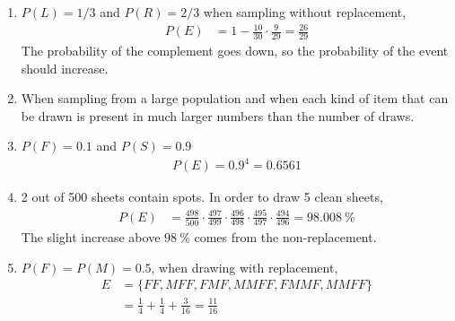\begin{enumerate}
    \item $ P(L) = 1/3 $ and $ P(R) = 2/3 $ when sampling without replacement,
          \begin{align}
              P(E) & = 1 - \frac{10}{30} \cdot \frac{9}{29} = \frac{26}{29}
          \end{align}
          The probability of the complement goes down, so the probability of the event
          should increase.

    \item When sampling from a large population and when each kind of item
          that can be drawn is present in much larger numbers than the number of draws.

    \item $ P(F) = 0.1 $ and $ P(S) = 0.9 $
          \begin{align}
              P(E) = 0.9^4 = 0.6561
          \end{align}

    \item 2 out of 500 sheets contain spots. In order to draw 5 clean sheets,
          \begin{align}
              P(E) & = \frac{498}{500} \cdot \frac{497}{499} \cdot \frac{496}{498} \cdot
              \frac{495}{497} \cdot \frac{494}{496} = \SI{98.008}{\percent}
          \end{align}
          The slight increase above $ \SI{98}{\percent} $ comes from the
          non-replacement.

    \item $ P(F) = P(M) = 0.5 $, when drawing with replacement,
          \begin{align}
              E & = \{FF, MFF, FMF, MMFF, FMMF, MMFF\}                        \\
                & =  \frac{1}{4} + \frac{1}{4} + \frac{3}{16} = \frac{11}{16}
          \end{align}


\end{enumerate}
